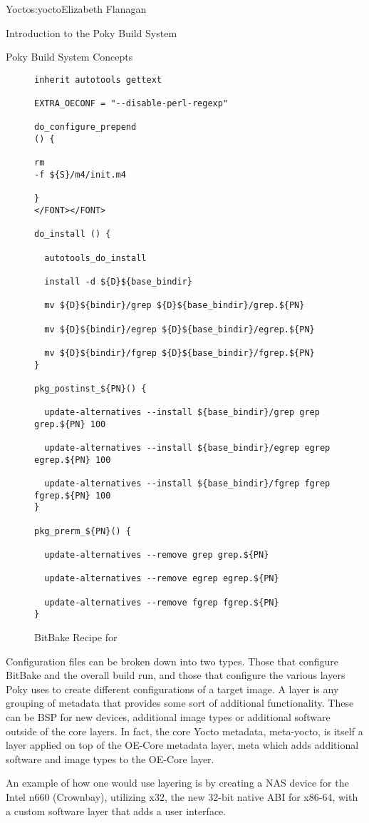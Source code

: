 \begin{aosachapter}{Yocto}{s:yocto}{Elizabeth Flanagan}
\begin{aosasect1}{Introduction to the Poky Build System}
\begin{aosasect2}{Poky Build System Concepts}
\begin{figure}
\begin{verbatim}
inherit autotools gettext

EXTRA_OECONF = "--disable-perl-regexp"

do_configure_prepend
() {

rm
-f ${S}/m4/init.m4

}
</FONT></FONT>

do_install () {

  autotools_do_install

  install -d ${D}${base_bindir}

  mv ${D}${bindir}/grep ${D}${base_bindir}/grep.${PN}

  mv ${D}${bindir}/egrep ${D}${base_bindir}/egrep.${PN}

  mv ${D}${bindir}/fgrep ${D}${base_bindir}/fgrep.${PN}
}

pkg_postinst_${PN}() {

  update-alternatives --install ${base_bindir}/grep grep grep.${PN} 100

  update-alternatives --install ${base_bindir}/egrep egrep egrep.${PN} 100

  update-alternatives --install ${base_bindir}/fgrep fgrep fgrep.${PN} 100
}

pkg_prerm_${PN}() {

  update-alternatives --remove grep grep.${PN}

  update-alternatives --remove egrep egrep.${PN}

  update-alternatives --remove fgrep fgrep.${PN}
}
\end{verbatim}
\caption{BitBake Recipe for }
\label{fig.yocto.recipe}
\end{figure}

Configuration files can be broken down into two types. Those that
configure BitBake and the overall build run, and those that configure
the various layers Poky uses to create different configurations of a
target image. A layer is any grouping of metadata that provides some
sort of additional functionality. These can be BSP for new devices,
additional image types or additional software outside of the core
layers. In fact, the core Yocto metadata, meta-yocto, is itself a
layer applied on top of the OE-Core metadata layer, meta which adds
additional software and image types to the OE-Core layer.

An example of how one would use layering is by creating a NAS device
for the Intel n660 (Crownbay), utilizing x32, the new 32-bit native
ABI for x86-64, with a custom software layer that adds a user
interface.


\end{aosasect2}
\end{aosasect1}
\end{aosachapter}
